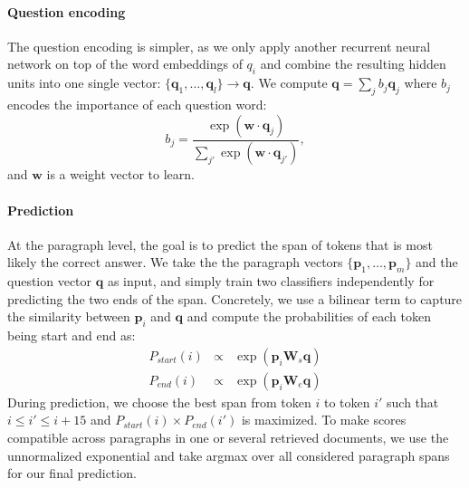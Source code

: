 \documentclass[11pt,a4paper]{article}
\begin{document}

\paragraph{\textbf{Question encoding}} The question encoding is simpler, as we only apply another recurrent neural network on top of the word embeddings of $q_i$ and combine the resulting hidden units into one single vector: $\{\mathbf{q}_1, \ldots, \mathbf{q}_l\} \rightarrow \mathbf{q}$. We compute $\mathbf{q} = \sum_j{b_j \mathbf{q}_j}$ where $b_j$ encodes the importance of each question word:
\begin{equation*}
	b_j = \frac{\exp(\mathbf{w} \cdot \mathbf{q}_j)}{\sum_{j'}{\exp(\mathbf{w} \cdot \mathbf{q}_{j'})}},
\end{equation*}
and $\mathbf{w}$ is a weight vector to learn.

\paragraph{\textbf{Prediction}} At the paragraph level, the goal is to predict the span of tokens that is most likely the correct answer. We take the
the paragraph vectors $\{\mathbf{p}_1, \ldots, \mathbf{p}_m\}$ and the question vector $\mathbf{q}$ as input, and simply train two classifiers independently for predicting the two ends of the span. Concretely, we use a bilinear term to capture the similarity between $\mathbf{p}_i$ and $\mathbf{q}$ and compute the probabilities of each token being start and end as:
\begin{eqnarray*}
P_{start}(i) & \propto & \exp \left(\mathbf{p}_i \mathbf{W}_{s} \mathbf{q}\right) \\
P_{end}(i) & \propto & \exp \left(\mathbf{p}_i \mathbf{W}_{e} \mathbf{q}\right)
\end{eqnarray*}
During prediction, we choose the best span from token $i$ to token $i'$ such that $i \leq i' \leq i + 15$ and $P_{start}(i) \times P_{end}(i')$ is maximized.
To make scores compatible across paragraphs in one or several retrieved documents, we use the unnormalized exponential and take argmax over all considered paragraph spans for our final prediction.
\end{document}
